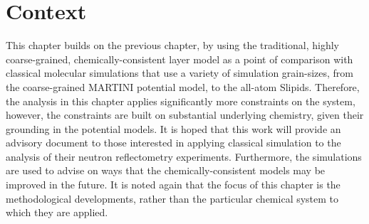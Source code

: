 \section*{Context}
This chapter builds on the previous chapter, by using the traditional, highly coarse-grained, chemically-consistent layer model as a point of comparison with classical molecular simulations that use a variety of simulation grain-sizes, from the coarse-grained MARTINI potential model, to the all-atom Slipids.
Therefore, the analysis in this chapter applies significantly more constraints on the system, however, the constraints are built on substantial underlying chemistry, given their grounding in the potential models.
It is hoped that this work will provide an advisory document to those interested in applying classical simulation to the analysis of their neutron reflectometry experiments.
Furthermore, the simulations are used to advise on ways that the chemically-consistent models may be improved in the future.
It is noted again that the focus of this chapter is the methodological developments, rather than the particular chemical system to which they are applied.
